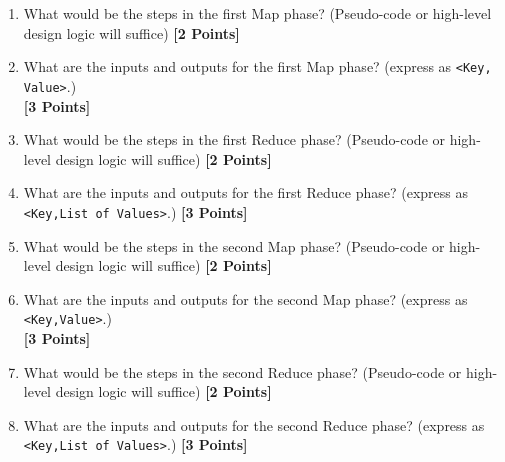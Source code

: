 \documentclass{article}
\begin{document}
\begin{enumerate}
\item What would be the steps in the first Map phase? (Pseudo-code or high-level design logic will suffice) \textbf{[2 Points]}

\item What are the inputs and outputs for the first Map phase? (express as \verb|<Key, Value>|.)\\ \textbf{[3 Points]}

\item What would be the steps in the first Reduce phase? (Pseudo-code or high-level design logic will suffice) \textbf{[2 Points]}

\item What are the inputs and outputs for the first Reduce phase? (express as \verb|<Key,List of Values>|.) \textbf{[3 Points]}

\item What would be the steps in the second Map phase? (Pseudo-code or high-level design logic will suffice) \textbf{[2 Points]}

\item What are the inputs and outputs for the second Map phase? (express as \verb|<Key,Value>|.)\\ \textbf{[3 Points]}

\item What would be the steps in the second Reduce phase? (Pseudo-code or high-level design logic will suffice) \textbf{[2 Points]}

\item What are the inputs and outputs for the second Reduce phase? (express as \verb|<Key,List of Values>|.) \textbf{[3 Points]}

\end{enumerate}
\end{document}

